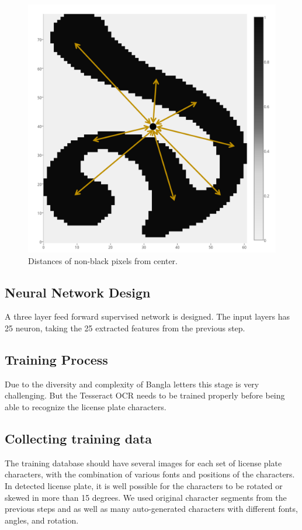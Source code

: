 \documentclass{standalone}
\begin{document}
\begin{figure}
\centering
\includegraphics[width=0.8\linewidth]{./img/feature/dist}
\caption{Distances of non-black pixels from center.}
\label{fig:FeatureDist}
\end{figure}








\subsection{Neural Network Design}
A three layer feed forward supervised network is designed. The input layers has 25 neuron, taking the 25 extracted features from the previous step. 


\subsection{Training Process}
Due to the diversity and complexity of Bangla letters this stage is very challenging. But the Tesseract OCR needs to be trained properly before being able to recognize the license plate characters.

\subsection{Collecting training data}
The training database should have several images for each set of license plate characters, with the combination of various fonts and positions of the characters. In detected license plate, it is well possible for the characters to be rotated or skewed in more than 15 degrees. We used original character segments from the previous steps and as well as many auto-generated characters with different fonts, angles, and rotation. 
\end{document}
